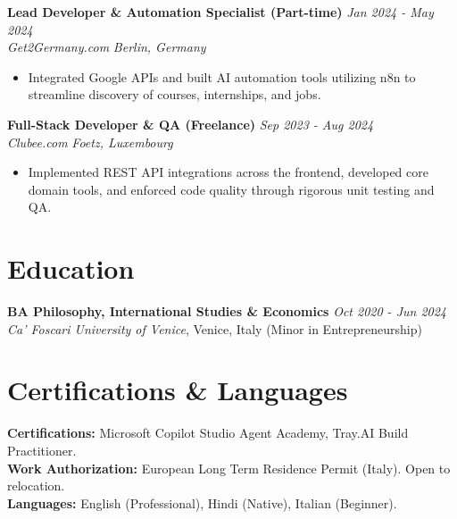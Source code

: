 \documentclass[11pt, a4paper]{article}
\begin{document}
\vspace{6pt}
\noindent \textbf{Lead Developer \& Automation Specialist (Part-time)} \hfill \textit{Jan 2024 - May 2024} \\
\textit{Get2Germany.com} \hfill \textit{Berlin, Germany}
\begin{itemize}[leftmargin=1.5em, itemsep=2pt]
    \item Integrated Google APIs and built AI automation tools utilizing n8n to streamline discovery of courses, internships, and jobs.
\end{itemize}

\vspace{6pt}
\noindent \textbf{Full-Stack Developer \& QA (Freelance)} \hfill \textit{Sep 2023 - Aug 2024} \\
\textit{Clubee.com} \hfill \textit{Foetz, Luxembourg}
\begin{itemize}[leftmargin=1.5em, itemsep=2pt]
    \item Implemented REST API integrations across the frontend, developed core domain tools, and enforced code quality through rigorous unit testing and QA.
\end{itemize}

\section*{Education}
\noindent \textbf{BA Philosophy, International Studies \& Economics} \hfill \textit{Oct 2020 - Jun 2024} \\
\textit{Ca' Foscari University of Venice}, Venice, Italy (Minor in Entrepreneurship)

\section*{Certifications \& Languages}
\textbf{Certifications:} Microsoft Copilot Studio Agent Academy, Tray.AI Build Practitioner. \\
\textbf{Work Authorization:} European Long Term Residence Permit (Italy). Open to relocation. \\
\textbf{Languages:} English (Professional), Hindi (Native), Italian (Beginner).
\end{document}
